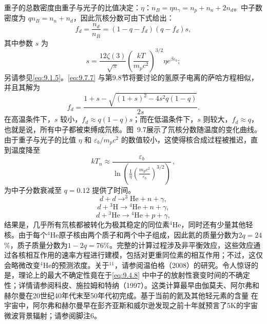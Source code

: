 重子的总数密度由重子与光子的比值决定：\(\eta\)：\(n_{B}=\eta n_{\gamma}=n_{p}+n_{n}+2n_{d}\)。中子数密度为 \(qn_{B}=n_{n}+n_{d}\)，因此氘核分数可由下式给出：
\begin{equation}\tag{9.7.7}\label{eq:9.7.7}
f _ { d } = \frac { n _ { d } } { n _ { B } } = ( 1 - q - f _ { d } ) ( q - f _ { d } ) s ,
\end{equation}
其中参数 \(s\) 为
\begin{equation}\tag{9.7.8}\label{eq:9.7.8}
s = \frac { 12 \zeta ( 3 ) } { \sqrt { \pi } } \left( \frac { k T } { m _ { p } c ^{2} } \right) ^{3 / 2} \eta e ^{\beta \varepsilon _ { b} } ;
\end{equation}
另请参见\autoref{eq:9.1.5}。\autoref{eq:9.7.7} 与第9.8节将要讨论的氢原子电离的萨哈方程相似，并且其解为
\begin{equation}\tag{9.7.9}\label{eq:9.7.9}
f _ { d } = \frac { 1 + s - \sqrt { ( 1 + s ) ^{2} - 4 s ^{2} q ( 1 - q ) } } { 2 s } .
\end{equation}
在高温条件下，\(s\) 较小，\(f_{d} \approx q(1-q)s\)；而在低温条件下，\(s\) 则较大，\(f_{d} \approx q\)，也就是说，所有中子都被束缚成氘核。图~9.7展示了氘核分数随温度的变化曲线。由于重子与光子的比值 \(\eta\) 和 \(\varepsilon_{b}/m_{p}c^{2}\) 的数值较小，这使得核合成过程被推迟，直到温度降至
\begin{equation}\tag{9.7.10}\label{eq:9.7.10}
k T _ { n } \approx \frac { \varepsilon _ { b } } { \ln \left( \frac { 1 } { \eta } \left( \frac { m _ { p } c ^{2} } { \varepsilon _ { b } } \right) ^{3 / 2} \right) } \, ,
\end{equation}
为中子分数衰减至 \(q=0.12\) 提供了时间。
\begin{equation}\tag{9.7.11}\label{eq:9.7.11}
d + d \rightarrow ^{3} \mathrm { H e } + n + \gamma ,
\end{equation}
\begin{equation}\tag{9.7.12}\label{eq:9.7.12}
d + \mathrm { ^ 3 H } \rightarrow \mathrm { ^ 4 H e } + n + \gamma ,
\end{equation}
\begin{equation}\tag{9.7.13}\label{eq:9.7.13}
d + \mathrm { ^ 3 H e } \rightarrow \mathrm { ^ 4 H e } + p + \gamma ,
\end{equation}
结果是，几乎所有氘核都被转化为极其稳定的同位素\(^{4}\)He，同时还有少量其他轻核。由于每个\(^{4}\)He原子核由两个质子和两个中子组成，因此氦的质量分数为\(2q=24\)\%，质子质量分数为\(1-2q=76\)\%。完整的计算过程涉及非平衡效应，这些效应通过各核相互作用的速率方程进行建模，包括对更重同位素的相互作用；不过，这仅会略微改变\(^{4}\)He的预测浓度。关于\(^{11}\)，请参阅温伯格（2008）的研究。令人惊讶的是，理论上的最大不确定性竟在于\autoref{eq:9.4.8} 中中子的放射性衰变时间的不确定性；详情请参阅科皮、施拉姆和特纳（1997）。这类计算最早由伽莫夫、阿尔弗和赫尔曼在20世纪40年代末至50年代初完成。基于当前的氦及其他轻元素的含量
在宇宙中，阿尔弗和赫尔曼早在彭齐亚斯和威尔逊发现之前十年就预言了5K的宇宙微波背景辐射；请参阅脚注6。

